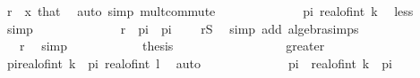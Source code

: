 \begin{isabellebody}
\ {\isacartoucheopen}r\ {\isasymle}\ x{\isacartoucheclose}\ that\ \isamarkupfalse%
\ {\isacharparenleft}{\kern0pt}auto\ simp{\isacharcolon}{\kern0pt}\ mult{\isachardot}{\kern0pt}commute{\isacharparenright}{\kern0pt}\isanewline
\ \ \ \ \ \ \ \ \isamarkupfalse%
\ \isamarkupfalse%
\ {\isachardoublequoteopen}{\isasymdots}\ {\isasymle}\ pi{\isacharasterisk}{\kern0pt}\ real{\isacharunderscore}{\kern0pt}of{\isacharunderscore}{\kern0pt}int\ {\isacharparenleft}{\kern0pt}k{\isacharminus}{\kern0pt}{}{\isacharparenright}{\kern0pt}{\isachardoublequoteclose}\ \isamarkupfalse%
\ less\ \isamarkupfalse%
\ simp\isanewline
\ \ \ \ \ \ \ \ \isamarkupfalse%
\ \isamarkupfalse%
\ {\isachardoublequoteopen}{\isasymdots}\ {\isacharless}{\kern0pt}\ r\ {\isacharminus}{\kern0pt}\ pi\ {\isacharplus}{\kern0pt}\ pi\ {\isacharslash}{\kern0pt}\ {}{\isachardoublequoteclose}\ \isamarkupfalse%
\ {\isacartoucheopen}r{\isasymin}{\isacharquery}{\kern0pt}S{\isacartoucheclose}\ \isamarkupfalse%
\ {\isacharparenleft}{\kern0pt}simp\ add{\isacharcolon}{\kern0pt}\ algebra{\isacharunderscore}{\kern0pt}simps{\isacharparenright}{\kern0pt}\isanewline
\ \ \ \ \ \ \ \ \isamarkupfalse%
\ \isamarkupfalse%
\ {\isachardoublequoteopen}{\isasymdots}\ {\isacharless}{\kern0pt}\ r{\isachardoublequoteclose}\ \isamarkupfalse%
\ simp\isanewline
\ \ \ \ \ \ \ \ \isamarkupfalse%
\ \isamarkupfalse%
\ {\isacharquery}{\kern0pt}thesis\ \isakeywordONE{{\isachardot}{\kern0pt}}\isamarkupfalse%
\isanewline
\ \ \ \ \ \ \isamarkupfalse%
\isanewline
\ \ \ \ \ \ \ \ \isamarkupfalse%
\ greater\isanewline
\ \ \ \ \ \ \ \ \isamarkupfalse%
\ \isamarkupfalse%
\ {\isachardoublequoteopen}pi{\isacharasterisk}{\kern0pt}real{\isacharunderscore}{\kern0pt}of{\isacharunderscore}{\kern0pt}int\ {\isacharparenleft}{\kern0pt}k{\isacharplus}{\kern0pt}{}{\isacharparenright}{\kern0pt}\ {\isasymle}\ pi{\isacharasterisk}{\kern0pt}\ real{\isacharunderscore}{\kern0pt}of{\isacharunderscore}{\kern0pt}int\ l{\isachardoublequoteclose}\ \isamarkupfalse%
\ auto\isanewline
\ \ \ \ \ \ \ \ \isamarkupfalse%
\ \isamarkupfalse%
\ {\isachardoublequoteopen}{\isasymdots}\ {\isacharless}{\kern0pt}\ pi\ {\isacharasterisk}{\kern0pt}\ real{\isacharunderscore}{\kern0pt}of{\isacharunderscore}{\kern0pt}int\ k\ {\isacharplus}{\kern0pt}\ pi\ {\isacharslash}{\kern0pt}\ {}{\isachardoublequoteclose}\isanewline

\end{isabellebody}
